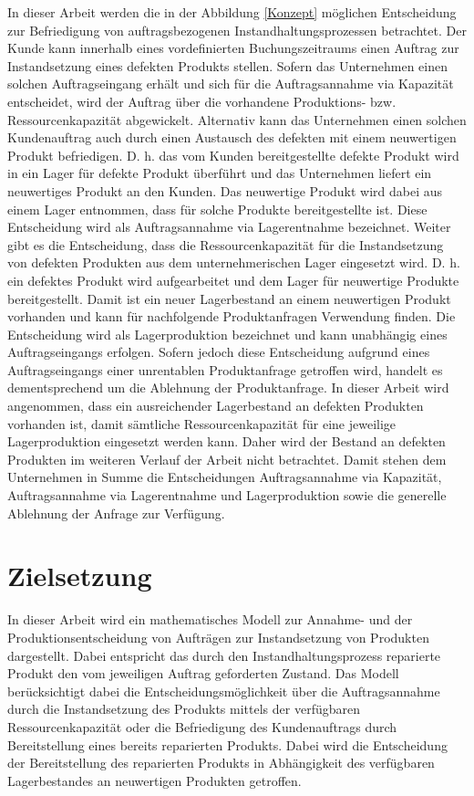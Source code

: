 In dieser Arbeit werden die in der Abbildung \ref{Konzept} möglichen Entscheidung zur Befriedigung von auftragsbezogenen Instandhaltungsprozessen betrachtet. Der Kunde kann innerhalb eines vordefinierten Buchungszeitraums einen Auftrag zur Instandsetzung eines defekten Produkts stellen. Sofern das Unternehmen einen solchen Auftragseingang erhält und sich für die \glqq Auftragsannahme via Kapazität{\grqq} entscheidet, wird der Auftrag über die vorhandene Produktions- bzw. Ressourcenkapazität abgewickelt. Alternativ kann das Unternehmen einen solchen Kundenauftrag auch durch einen Austausch des defekten mit einem neuwertigen Produkt befriedigen. D. h. das vom Kunden bereitgestellte defekte Produkt wird in ein Lager für defekte Produkt überführt und das Unternehmen liefert ein neuwertiges Produkt an den Kunden. Das neuwertige Produkt wird dabei aus einem Lager entnommen, dass für solche Produkte bereitgestellte ist. Diese Entscheidung wird als \glqq Auftragsannahme via Lagerentnahme{\grqq} bezeichnet. Weiter gibt es die Entscheidung, dass die Ressourcenkapazität für die Instandsetzung von defekten Produkten aus dem unternehmerischen Lager eingesetzt wird. D. h. ein defektes Produkt wird aufgearbeitet und dem Lager für neuwertige Produkte bereitgestellt. Damit ist ein neuer Lagerbestand an einem neuwertigen Produkt vorhanden und kann für nachfolgende Produktanfragen Verwendung finden. Die Entscheidung wird als \glqq Lagerproduktion{\grqq} bezeichnet und kann unabhängig eines Auftragseingangs erfolgen. Sofern jedoch diese Entscheidung aufgrund eines Auftragseingangs einer unrentablen Produktanfrage getroffen wird, handelt es dementsprechend um die Ablehnung der Produktanfrage. In dieser Arbeit wird angenommen, dass ein ausreichender Lagerbestand an defekten Produkten vorhanden ist, damit sämtliche Ressourcenkapazität für eine jeweilige Lagerproduktion eingesetzt werden kann. Daher wird der Bestand an defekten Produkten im weiteren Verlauf der Arbeit nicht betrachtet. Damit stehen dem Unternehmen in Summe die Entscheidungen \glqq Auftragsannahme via Kapazität{\grqq}, \glqq Auftragsannahme via Lagerentnahme{\grqq} und \glqq Lagerproduktion{\grqq} sowie die generelle \glqq Ablehnung der Anfrage{\grqq} zur Verfügung.

\section{Zielsetzung}

In dieser Arbeit wird ein mathematisches Modell zur Annahme- und der Produktionsentscheidung von Aufträgen zur Instandsetzung von Produkten dargestellt. Dabei entspricht das durch den Instandhaltungsprozess reparierte Produkt den vom jeweiligen Auftrag geforderten Zustand. Das Modell berücksichtigt dabei die Entscheidungsmöglichkeit über die Auftragsannahme durch die Instandsetzung des Produkts mittels der verfügbaren Ressourcenkapazität oder die Befriedigung des Kundenauftrags durch Bereitstellung eines bereits reparierten Produkts. Dabei wird die Entscheidung der Bereitstellung des reparierten Produkts in Abhängigkeit des verfügbaren Lagerbestandes an neuwertigen Produkten getroffen.

